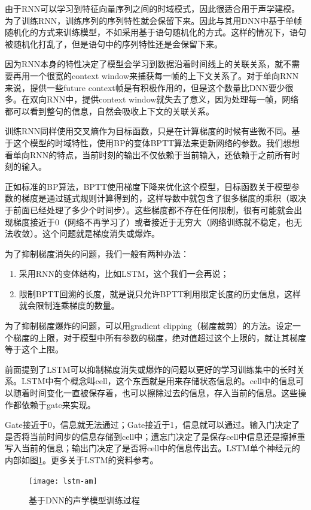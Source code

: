 由于RNN可以学习到特征向量序列之间的时域模式，因此很适合用于声学建模。为了训练RNN，训练序列的序列特性就会保留下来。因此与其用DNN中基于单帧随机化的方式来训练模型，不如采用基于语句随机化的方式。这样的情况下，语句被随机化打乱了，但是语句中的序列特性还是会保留下来。

因为RNN本身的特性决定了模型会学习到数据沿着时间线上的关联关系，就不需要再用一个很宽的context window来捕获每一帧的上下文关系了。对于单向RNN来说，提供一些future context帧是有积极作用的，但是这个数量比DNN要少很多。在双向RNN中，提供context window就失去了意义，因为处理每一帧，网络都可以看到整句的信息，自然会吸收上下文的关联关系。

训练RNN同样使用交叉熵作为目标函数，只是在计算梯度的时候有些微不同。基于这个模型的时域特性，使用BP的变体BPTT算法来更新网络的参数。我们想想看单向RNN的特点，当前时刻的输出不仅依赖于当前输入，还依赖于之前所有时刻的输入。

正如标准的BP算法，BPTT使用梯度下降来优化这个模型，目标函数关于模型参数的梯度是通过链式规则计算得到的，这样导数中就包含了很多梯度的乘积（取决于前面已经处理了多少个时间步）。这些梯度都不存在任何限制，很有可能就会出现梯度接近于0（网络不再学习了）或者接近于无穷大（网络训练就不稳定，也无法收敛）。这个问题就是梯度消失或爆炸。

为了抑制梯度消失的问题，我们一般有两种办法：
\begin{enumerate}
	\item 采用RNN的变体结构，比如LSTM，这个我们一会再说；
	\item 限制BPTT回溯的长度，就是说只允许BPTT利用限定长度的历史信息，这样就会限制连乘梯度的数量。
\end{enumerate}

为了抑制梯度爆炸的问题，可以用gradient clipping（梯度裁剪）的方法。设定一个梯度的上限，对于模型中所有参数的梯度，绝对值超过这个上限的，就让其梯度等于这个上限。

前面提到了LSTM可以抑制梯度消失或爆炸的问题以更好的学习训练集中的长时关系。LSTM中有个概念叫cell，这个东西就是用来存储状态信息的。cell中的信息可以随着时间变化一直被保存着，也可以擦除过去的信息，存入当前的信息。这些操作都依赖于gate来实现。

Gate接近于0，信息就无法通过；Gate接近于1，信息就可以通过。输入门决定了是否将当前时间步的信息存储到cell中；遗忘门决定了是保存cell中信息还是擦掉重写入当前的信息；输出门决定了是否将cell中的信息传出去。LSTM单个神经元的内部如图\ref{fig:lstm-am}。更多关于LSTM的资料参考。
\begin{figure}[htbp]
	\centering
	\texttt{[image: lstm-am]}
	\caption{基于DNN的声学模型训练过程\label{fig:lstm-am}}
\end{figure}


